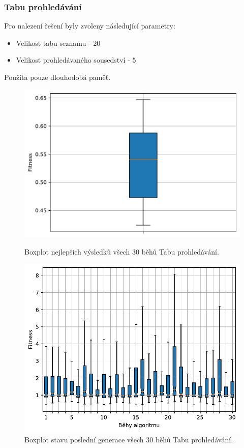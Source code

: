 \subsubsection{Tabu prohledávání}
Pro nalezení řešení byly zvoleny následující parametry:
\begin{itemize}
    \item Velikost tabu seznamu - $20$
    \item Velikost prohledávaného sousedství - $5$
\end{itemize}
Použita pouze dlouhodobá paměť.

\begin{figure}[H]
\begin{minipage}[t]{0.475\linewidth}
\includegraphics[width=\linewidth]{obrazky-figures/statistics/Benchmarks/Griewank/TABU/bestsBoxplot_WithOutliers.pdf}
\caption{Boxplot nejlepších výsledků všech $30$ běhů Tabu prohledávání.}
\label{fg:bench:griewank:tabu:best}
\end{minipage}
\hfill
\begin{minipage}[t]{0.475\linewidth}
\includegraphics[width=\linewidth]{obrazky-figures/statistics/Benchmarks/Griewank/TABU/lastGenBoxplots.pdf}
\caption{Boxplot stavu poslední generace všech $30$ běhů Tabu prohledávání.}
\label{fg:bench:griewank:tabu:lastGen}
\end{minipage}
\end{figure}

